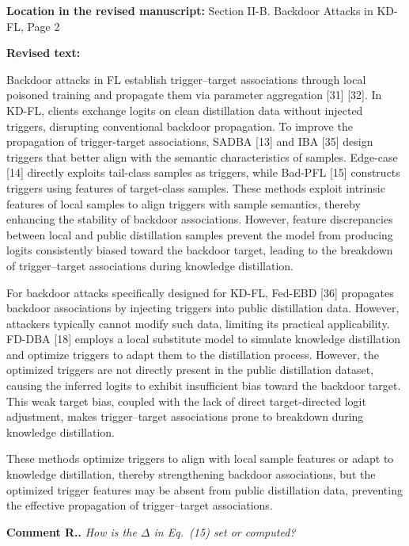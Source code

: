 \documentclass[11pt,a4paper]{article}
\newcommand{\manualindent}{\par\noindent\hspace*{1.5em}\ignorespaces}
\newcounter{reviewernum}
\newcounter{commentnum}
\newcommand{\reviewcomment}[1]{%
  \stepcounter{commentnum}%
  \begin{tcolorbox}[
      enhanced,breakable,colback=black!3,colframe=black!20,
      boxrule=0.5pt,arc=1.2mm,left=9pt,right=9pt,top=8pt,bottom=8pt]
    {\bfseries Comment R\arabic{reviewernum}.\arabic{commentnum}.}\quad
    {\itshape #1}
  \end{tcolorbox}%
}
\newcommand{\revisedtext}[2]{%
  {\bfseries\color{headingnavy}Location in the revised manuscript:} #1\par
  \begin{tcolorbox}[
      enhanced,breakable,colback=replyblue!3,colframe=replyblue!18,
      before upper={\setlength{\parskip}{6pt}},
      borderline west={2.5pt}{0pt}{replyblue},
      boxrule=0.5pt,arc=1mm,left=11pt,right=9pt,top=8pt,bottom=8pt]
    {\bfseries\color{headingnavy}Revised text:}\par
    #2
  \end{tcolorbox}
  \vspace{0.35em}%
}
\begin{document}
\revisedtext{Section II-B. Backdoor Attacks in KD-FL, Page 2}{\manualindent Backdoor attacks in FL establish trigger--target associations through local poisoned training and propagate them via parameter aggregation [31] [32].
In KD-FL, clients exchange logits on clean distillation data without injected triggers, disrupting conventional backdoor propagation.
To improve the propagation of trigger-target associations, SADBA [13] and IBA [35] design triggers that better align with the semantic characteristics of samples.
Edge-case [14] directly exploits tail-class samples as triggers, while Bad-PFL [15] constructs triggers using features of target-class samples.
These methods exploit intrinsic features of local samples to align triggers with sample semantics, thereby enhancing the stability of backdoor associations.
However, feature discrepancies between local and public distillation samples prevent the model from producing logits consistently biased toward the backdoor target, leading to the breakdown of trigger--target associations during knowledge distillation.

\manualindent For backdoor attacks specifically designed for KD-FL, Fed-EBD [36] propagates backdoor associations by injecting triggers into public distillation data. However, attackers typically cannot modify such data, limiting its practical applicability.
FD-DBA [18] employs a local substitute model to simulate knowledge distillation and optimize triggers to adapt them to the distillation process.
However, the optimized triggers are not directly present in the public distillation dataset, causing the inferred logits to exhibit insufficient bias toward the backdoor target. 
This weak target bias, coupled with the lack of direct target-directed logit adjustment, makes trigger–target associations prone to breakdown during knowledge distillation.

\manualindent These methods optimize triggers to align with local sample features or adapt to knowledge distillation, thereby strengthening backdoor associations, but the optimized trigger features may be absent from public distillation data, preventing the effective propagation of trigger--target associations.}

\reviewcomment{ How is the \(\Delta\) in Eq.~(15) set or computed?}
\end{document}
